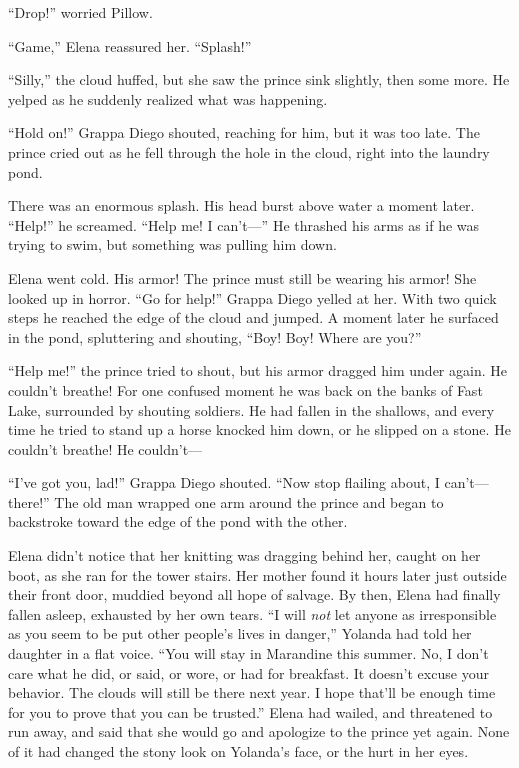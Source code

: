 \documentclass[10pt]{book}
\begin{document}
``Drop!'' worried Pillow.

``Game,'' Elena reassured her. ``Splash!''

``Silly,'' the cloud huffed, but she saw the prince sink slightly, then some more. He yelped as he suddenly realized what was happening.

``Hold on!'' Grappa Diego shouted, reaching for him, but it was too late. The prince cried out as he fell through the hole in the cloud, right into the laundry pond.

There was an enormous splash. His head burst above water a moment later. ``Help!'' he screamed. ``Help me! I can't---'' He thrashed his arms as if he was trying to swim, but something was pulling him down.

Elena went cold. His armor! The prince must still be wearing his armor! She looked up in horror. ``Go for help!'' Grappa Diego yelled at her. With two quick steps he reached the edge of the cloud and jumped. A moment later he surfaced in the pond, spluttering and shouting, ``Boy! Boy! Where are you?''

``Help me!'' the prince tried to shout, but his armor dragged him under again. He couldn't breathe! For one confused moment he was back on the banks of Fast Lake, surrounded by shouting soldiers. He had fallen in the shallows, and every time he tried to stand up a horse knocked him down, or he slipped on a stone. He couldn't breathe! He couldn't---

``I've got you, lad!'' Grappa Diego shouted. ``Now stop flailing about, I can't---there!'' The old man wrapped one arm around the prince and began to backstroke toward the edge of the pond with the other.

Elena didn't notice that her knitting was dragging behind her, caught on her boot, as she ran for the tower stairs. Her mother found it hours later just outside their front door, muddied beyond all hope of salvage. By then, Elena had finally fallen asleep, exhausted by her own tears. ``I will \emph{not} let anyone as irresponsible as you seem to be put other people's lives in danger,'' Yolanda had told her daughter in a flat voice. ``You will stay in Marandine this summer. No, I don't care what he did, or said, or wore, or had for breakfast. It doesn't excuse your behavior. The clouds will still be there next year. I hope that'll be enough time for you to prove that you can be trusted.'' Elena had wailed, and threatened to run away, and said that she would go and apologize to the prince yet again. None of it had changed the stony look on Yolanda's face, or the hurt in her eyes.
\end{document}
